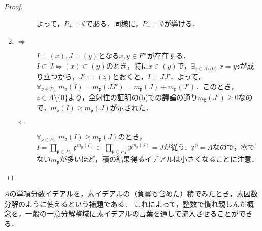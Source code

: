 \documentclass[uplatex,dvipdfmx]{jsreport}
\renewcommand{\p}{\mathfrak{p}}
\begin{document}
\begin{proof}
\begin{enumerate}
\begin{description}
            よって，$P_+=\emptyset$である．同様に，$P_-=\emptyset$が導ける．
        \end{description}
        \item
        \begin{description}
            \item[$\Rightarrow$] $I=(x),J=(y)$となる$x,y\in F^\times$が存在する．
            $I\subset J\Leftrightarrow(x)\subset(y)$のとき，特に$x\in(y)$で，$\exists_{z\in A\setminus\{0\}}\;x=yz$が成り立つから，$J':=(z)$とおくと，$I=JJ'$．よって，$\forall_{\p\in P_A}\;m_\p(I)=m_\p(JJ')=m_\p(J)+m_\p(J')$．このとき，$z\in A\setminus\{0\}$より，全射性の証明の(b)での議論の通り$m_\p(J')\ge 0$なので，$m_\p(I)\ge m_\p(J)$が示された．
            \item[$\Leftarrow$] $\forall_{\p\in P_A}\;m_\p(I)\ge m_\p(J)$のとき，$I=\prod_{\p\in P_A}\p^{m_\p(I)}\subset\prod_{\p\in P_A}\p^{m_\p(J)}=J$が従う．$\p^0=A$なので，零でない$m_\p$が多いほど，積の結果得るイデアルは小さくなることに注意．
        \end{description}
    \end{enumerate}
\end{proof}
\begin{remarks}[素元ではなく単項素イデアルに注目する]
    $A$の単項分数イデアルを，素イデアルの（負冪も含めた）積でみたとき，素因数分解のように使えるという補題である．
    これによって，整数で慣れ親しんだ概念を，一般の一意分解整域に素イデアルの言葉を通して流入させることができる．
\end{remarks}
\end{document}
